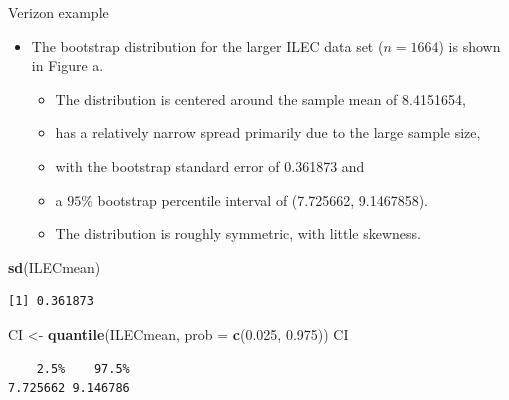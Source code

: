 \documentclass[
  ignorenonframetext,
]{beamer}
\newenvironment{Shaded}{\begin{snugshade}}{\end{snugshade}}
\newcommand{\AttributeTok}[1]{\textcolor[rgb]{0.13,0.29,0.53}{#1}}
\newcommand{\FloatTok}[1]{\textcolor[rgb]{0.00,0.00,0.81}{#1}}
\newcommand{\FunctionTok}[1]{\textcolor[rgb]{0.13,0.29,0.53}{\textbf{#1}}}
\newcommand{\NormalTok}[1]{#1}
\newcommand{\OtherTok}[1]{\textcolor[rgb]{0.56,0.35,0.01}{#1}}
\providecommand{\tightlist}{%
  \setlength{\itemsep}{0pt}\setlength{\parskip}{0pt}}
\begin{document}
\begin{frame}[fragile]{Verizon example}
\protect\hypertarget{verizon-example-3}{}
\begin{itemize}
\item
  The bootstrap distribution for the larger ILEC data set (\(n=1664\))
  is shown in Figure a.

  \begin{itemize}
  \tightlist
  \item
    The distribution is centered around the sample mean of 8.4151654,
  \item
    has a relatively narrow spread primarily due to the large sample
    size,
  \item
    with the bootstrap standard error of 0.361873 and
  \item
    a \(95\%\) bootstrap percentile interval of (7.725662, 9.1467858).
  \item
    The distribution is roughly symmetric, with little skewness.
  \end{itemize}
\end{itemize}

\small

\begin{Shaded}
\begin{Highlighting}[]
\FunctionTok{sd}\NormalTok{(ILECmean)}
\end{Highlighting}
\end{Shaded}

\begin{verbatim}
[1] 0.361873
\end{verbatim}

\begin{Shaded}
\begin{Highlighting}[]
\NormalTok{CI }\OtherTok{\textless{}{-}} \FunctionTok{quantile}\NormalTok{(ILECmean, }\AttributeTok{prob =} \FunctionTok{c}\NormalTok{(}\FloatTok{0.025}\NormalTok{, }\FloatTok{0.975}\NormalTok{))}
\NormalTok{CI}
\end{Highlighting}
\end{Shaded}

\begin{verbatim}
    2.5%    97.5% 
7.725662 9.146786 
\end{verbatim}

\normalsize
\end{frame}
\end{document}
